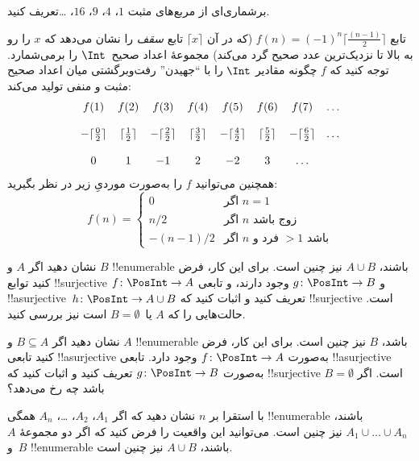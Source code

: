 \documentclass[../../../include/open-logic-section]{subfiles}
\begin{document}
\begin{prob}
برشماری‌ای از مربع‌های مثبت $1$، $4$، $9$، $16$، \dots تعریف کنید.
\end{prob}

\begin{ex}
تابع $f(n) = (-1)^{n} \lceil \frac{(n-1)}{2}\rceil$ (که در آن
$\lceil x \rceil$ تابع \emph{سقف} را نشان می‌دهد که $x$ را رو به بالا
تا نزدیک‌ترین عدد صحیح گرد می‌کند) مجموعهٔ اعداد صحیح~$\Int$ را
برمی‌شمارد. توجه کنید که $f$ چگونه مقادیر $\Int$ را با ``جهیدن'' رفت‌وبرگشتی
میان اعداد صحیح مثبت و منفی تولید می‌کند:
\[
\begin{array}{c c c c c c c c}
f(1) & f(2) & f(3) & f(4) & f(5) & f(6) & f(7) & \dots \\ \\
- \lceil \tfrac{0}{2} \rceil & \lceil \tfrac{1}{2}\rceil & - \lceil \tfrac{2}{2} \rceil & \lceil \tfrac{3}{2} \rceil & - \lceil \tfrac{4}{2} \rceil  & \lceil \tfrac{5}{2}
\rceil & - \lceil \tfrac{6}{2} \rceil & \dots \\ \\
0 & 1 & -1 & 2 & -2 & 3 & \dots
\end{array}
\]
همچنین می‌توانید $f$ را به‌صورت موردیِ زیر در نظر بگیرید:
\[
f(n) = \begin{cases}
  0 & \text{اگر $n = 1$}\\
  n/2 & \text{اگر $n$ زوج باشد}\\
  -(n-1)/2 & \text{اگر $n$ فرد و $>1$ باشد}
  \end{cases}
\]
\end{ex}

\begin{prob}
  نشان دهید اگر $A$ و $B$ !!{enumerable} باشند، $A \cup B$ نیز چنین
  است. برای این کار، فرض کنید توابع !!{surjective} $f\colon \PosInt \to
  A$ و $g\colon \PosInt \to B$ وجود دارند، و تابعی
  !!a{surjective}~$h\colon \PosInt \to A \cup B$ تعریف کنید و اثبات کنید که
  !!{surjective} است. حالت‌هایی را که $A$ یا~$B = \emptyset$ است نیز بررسی کنید.
\end{prob}

\begin{prob}
  نشان دهید اگر $B \subseteq A$ و $A$ !!{enumerable} باشد، $B$ نیز چنین
  است. برای این کار، فرض کنید تابعی !!a{surjective} به‌صورت $f\colon \PosInt \to
  A$ وجود دارد. تابعی !!a{surjective} به‌صورت $g\colon \PosInt \to B$
  تعریف کنید و اثبات کنید که !!{surjective} است. اگر $B = \emptyset$ باشد چه رخ می‌دهد؟
\end{prob}

\begin{prob}
  با استقرا بر $n$ نشان دهید که اگر $A_1$، $A_2$، \dots، $A_n$ همگی
  !!{enumerable} باشند، $A_1 \cup \dots \cup A_n$ نیز چنین است. می‌توانید
  این واقعیت را فرض کنید که اگر دو مجموعهٔ $A$ و~$B$ !!{enumerable}
  باشند، $A \cup
  B$ نیز چنین است.
\end{prob}
\end{document}
